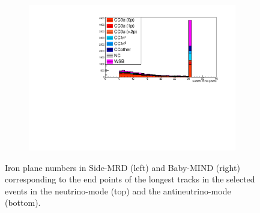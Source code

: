 \begin{figure}[tbh]
\begin{center}
\begin{subfigure}{0.48\textwidth}
    \end{subfigure}
  \begin{subfigure}{0.48\textwidth}
    \includegraphics[width=0.55\linewidth, angle=270]{fig/RHCMuonPenetration_DownstreamMRD_StoppedOrThroughGoing.pdf}
    \end{subfigure}    
    \end{center}
  \caption{
Iron plane numbers in Side-MRD (left) and Baby-MIND (right) corresponding to the end points of the longest tracks in the selected events in the neutrino-mode (top) and the antineutrino-mode (bottom).
}
\label{fig:endpoint_longest_track}
\end{figure}



%


